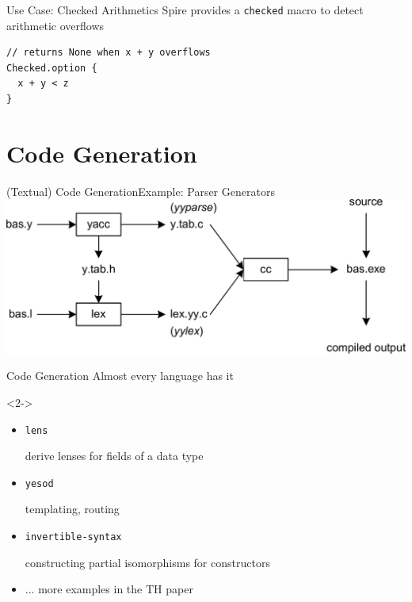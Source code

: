 \documentclass{beamer}
\begin{document}
\begin{frame}[fragile]{Use Case: Checked Arithmetics}
  Spire provides a \texttt{checked} macro to detect arithmetic overflows

  \vspace{1em}
  \begin{verbatim}
// returns None when x + y overflows
Checked.option {
  x + y < z
}
  \end{verbatim}
\end{frame}

  \section{Code Generation}

\begin{frame}[fragile]{(Textual) Code Generation}{Example: Parser Generators}
  \includegraphics[width=\linewidth]{img/yacc.png}
\end{frame}

\begin{frame}{Code Generation}
  Almost every language has it

  \begin{visibleenv}<2->
    \begin{itemize}
      \item \texttt{lens}

         derive lenses for fields of a data type
      \item \texttt{yesod}

        templating, routing
      \item \texttt{invertible-syntax}

        constructing partial isomorphisms for constructors

      \item ... more examples in the TH paper
    \end{itemize}
  \end{visibleenv}
\end{frame}
\end{document}
